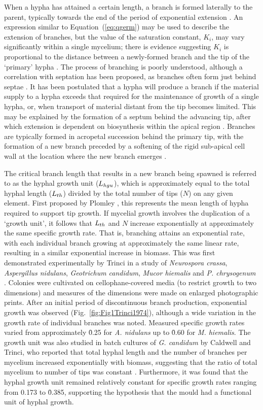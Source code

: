 When a hypha has attained a certain length, a branch is formed laterally to the parent, typically towards the end of the period of exponential extension \cite{trinci1974,prosser1995}. An expression similar to Equation~(\ref{eq:qgerm}) may be used to describe the extension of branches, but the value of the saturation constant, $K_i$, may vary significantly within a single mycelium; there is evidence suggesting $K_i$ is proportional to the distance between a newly-formed branch and the tip of the \lq primary' hypha \cite{spohr1998}. The process of branching is poorly understood, although a correlation with septation has been proposed, as branches often form just behind septae \cite{carlile2001}. It has been postulated that a hypha will produce a branch if the material supply to a hypha exceeds that required for the maintenance of growth of a single hypha, or, when transport of material distant from the tip becomes limited. This may be explained by the formation of a septum behind the advancing tip, after which extension is dependent on biosynthesis within the apical region \cite{prosser1995}. Branches are typically formed in acropetal succession behind the primary tip, with the formation of a new branch preceded by a softening of the rigid sub-apical cell wall at the location where the new branch emerges \cite{moore-landecker1996}.

The critical branch length that results in a new branch being spawned is referred to as the hyphal growth unit ($L_{hgu}$), which is approximately equal to the total hyphal length ($L_{th}$) divided by the total number of tips ($N$) on any given element. First proposed by Plomley \cite{plomley1959}, this represents the mean length of hypha required to support tip growth. If mycelial growth involves the duplication of a \lq growth unit', it follows that $L_{th}$ and $N$ increase exponentially at approximately the same specific growth rate. That is, branching attains an exponential rate, with each individual branch growing at approximately the same linear rate, resulting in a similar exponential increase in biomass. This was first demonstrated experimentally by Trinci in a study of \emph{Neurospora crassa}, \emph{Aspergillus nidulans}, \emph{Geotrichum candidum}, \emph{Mucor hiemalis} and \emph{P. chrysogenum} \cite{trinci1974}. Colonies were cultivated on cellophane-covered media (to restrict growth to two dimensions) and measures of the dimensions were made on enlarged photographic prints. After an initial period of discontinuous branch production, exponential growth was observed (Fig.~\ref{fig:Fig1Trinci1974}), although a wide variation in the growth rate of individual branches was noted. Measured specific growth rates varied from approximately \h{0.25} for \emph{A. nidulans} up to \h{0.60} for \emph{M. hiemalis}. The growth unit was also studied in batch cultures of \emph{G. candidum} by Caldwell and Trinci, who reported that total hyphal length and the number of branches per mycelium increased exponentially with biomass, suggesting that the ratio of total mycelium to number of tips was constant \cite{caldwell1973}. Furthermore, it was found that the hyphal growth unit remained relatively constant for specific growth rates ranging from 0.173 to \h{0.385}, supporting the hypothesis that the mould had a functional unit of hyphal growth.

